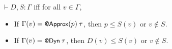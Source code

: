\begin{definition}
$\vdash D, S : \Gamma$
iff
for all $v \in \Gamma$,
\begin{itemize}
\item
If $\Gamma(v) = \text{\normalfont{\sffamily\small{@Approx}}}(p) \> \tau$,
then $p \le S(v)$ or $v \notin S$.
\item
If $\Gamma(v) = \text{\normalfont{\sffamily\small{@Dyn}}} \> \tau$,
then $D(v) \le S(v)$ or $v \notin S$.
\end{itemize}
\end{definition}
